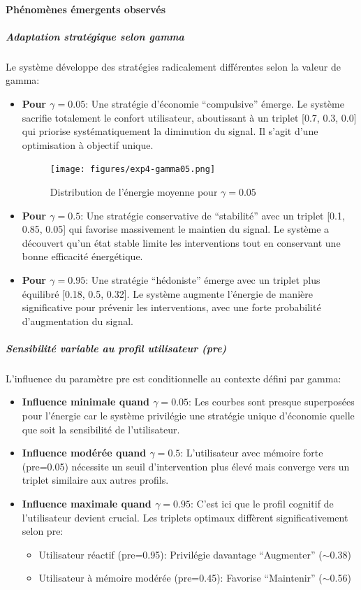 \documentclass[a4paper,11pt]{article}
\begin{document}
\paragraph{Phénomènes émergents observés}

\subparagraph{Adaptation stratégique selon gamma}
Le système développe des stratégies radicalement différentes selon la valeur de gamma:

\begin{itemize}
    \item \textbf{Pour $\gamma=0.05$}: Une stratégie d'économie ``compulsive'' émerge. Le système sacrifie totalement le confort utilisateur, aboutissant à un triplet [0.7, 0.3, 0.0] qui priorise systématiquement la diminution du signal. Il s'agit d'une optimisation à objectif unique.
    \begin{figure}
        \centering
        \texttt{[image: figures/exp4-gamma05.png]}
        \caption{Distribution de l'énergie moyenne pour $\gamma=0.05$}
        \label{fig:gamma_05}
    \end{figure}
    \item \textbf{Pour $\gamma=0.5$}: Une stratégie conservative de ``stabilité'' avec un triplet [0.1, 0.85, 0.05] qui favorise massivement le maintien du signal. Le système a découvert qu'un état stable limite les interventions tout en conservant une bonne efficacité énergétique.
    
    \item \textbf{Pour $\gamma=0.95$}: Une stratégie ``hédoniste'' émerge avec un triplet plus équilibré [0.18, 0.5, 0.32]. Le système augmente l'énergie de manière significative pour prévenir les interventions, avec une forte probabilité d'augmentation du signal.
\end{itemize}

\subparagraph{Sensibilité variable au profil utilisateur (pre)}
L'influence du paramètre pre est conditionnelle au contexte défini par gamma:

\begin{itemize}
    \item \textbf{Influence minimale quand $\gamma=0.05$}: Les courbes sont presque superposées pour l'énergie car le système privilégie une stratégie unique d'économie quelle que soit la sensibilité de l'utilisateur.
    
    \item \textbf{Influence modérée quand $\gamma=0.5$}: L'utilisateur avec mémoire forte (pre=0.05) nécessite un seuil d'intervention plus élevé mais converge vers un triplet similaire aux autres profils.
    
    \item \textbf{Influence maximale quand $\gamma=0.95$}: C'est ici que le profil cognitif de l'utilisateur devient crucial. Les triplets optimaux diffèrent significativement selon pre:
    \begin{itemize}
        \item Utilisateur réactif (pre=0.95): Privilégie davantage ``Augmenter'' ($\sim$0.38)
        \item Utilisateur à mémoire modérée (pre=0.45): Favorise ``Maintenir'' ($\sim$0.56)
    \end{itemize}
\end{itemize}
\end{document}
